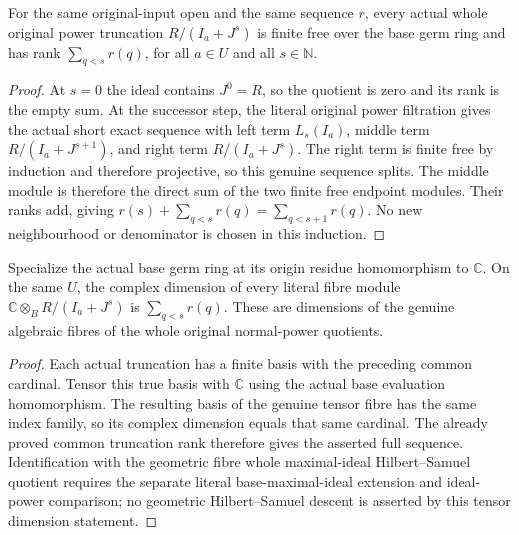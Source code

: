 \begin{theorem}
\label{hir:relative-normal-nearby-all-truncation-uniform-rank}
\leanok
{}
For the same original-input open and the same sequence $r$, every actual
whole original power truncation $R/(I_a+J^s)$ is finite free over the
base germ ring and has rank $\sum_{q<s}r(q)$, for all $a\in U$ and all
$s\in\mathbb N$.
\end{theorem}
\begin{proof}
At $s=0$ the ideal contains $J^0=R$, so the quotient is zero and its
rank is the empty sum. At the successor step, the literal original
power filtration gives the actual short exact sequence with left term
$L_s(I_a)$, middle term $R/(I_a+J^{s+1})$, and right term
$R/(I_a+J^s)$. The right term is finite free by induction and therefore
projective, so this genuine sequence splits. The middle module is
therefore the direct sum of the two finite free endpoint modules.
Their ranks add, giving $r(s)+\sum_{q<s}r(q)=\sum_{q<s+1}r(q)$.
No new neighbourhood or denominator is chosen in this induction.
\end{proof}

\begin{theorem}
\label{hir:relative-normal-nearby-complete-fibre-power-dimensions}
\leanok
{}
Specialize the actual base germ ring at its origin residue homomorphism to
$\mathbb C$. On the same $U$, the complex dimension of every literal
fibre module $\mathbb C\otimes_B R/(I_a+J^s)$ is
$\sum_{q<s}r(q)$. These are dimensions of the genuine algebraic fibres
of the whole original normal-power quotients.
\end{theorem}
\begin{proof}
Each actual truncation has a finite basis with the preceding common
cardinal. Tensor this true basis with $\mathbb C$ using the actual base
evaluation homomorphism. The resulting basis of the genuine tensor fibre
has the same index family, so its complex dimension equals that same
cardinal. The already proved common truncation rank therefore gives the
asserted full sequence. Identification with the geometric fibre whole
maximal-ideal Hilbert--Samuel quotient requires the separate literal
base-maximal-ideal extension and ideal-power comparison; no geometric
Hilbert--Samuel descent is asserted by this tensor dimension statement.
\end{proof}
